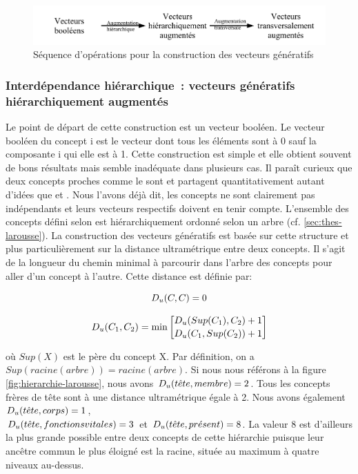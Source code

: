 \begin{figure}[h]
  
  \centering\includegraphics[width=16cm]{2_Etat-art/img/VG-VC}
\caption{Séquence d'opérations pour la construction des vecteurs génératifs}
\label{fig:VG-VC}
\end{figure}

\subsubsection{Interdépendance hiérarchique~: vecteurs génératifs
  hiérarchiquement augmentés}


Le point de départ de cette construction est un vecteur booléen. Le
vecteur booléen du concept i est le vecteur dont tous les éléments
sont à 0 sauf la composante i qui elle est à 1.  Cette construction
est simple et elle obtient souvent de bons résultats mais semble
inadéquate dans plusieurs cas.  Il paraît curieux que deux concepts
proches comme le sont  et  partagent
quantitativement autant d'idées que  et
.  Nous l'avons déjà dit, les concepts ne sont
clairement pas indépendants et leurs vecteurs respectifs doivent en
tenir compte.  L'ensemble des concepts défini selon
\cite{Thesaurus1992} est hiérarchiquement ordonné selon un arbre (cf.
\ref{sec:thes-larousse}).  La construction des vecteurs génératifs est
basée sur cette structure et plus particulièrement sur la distance
ultramétrique  entre deux concepts.  Il
s'agit de la longueur du chemin minimal à parcourir dans l'arbre des
concepts pour aller d'un concept à l'autre.  Cette distance est
définie par:

\begin{equation}
D_{u}(C, C) = 0 
\end{equation}

\begin{equation}
D_{u}(C_{1}, C_{2}) = \min 
{D_{u}(Sup(C_{1}), C_{2})+1 \brack
D_{u}(C_{1}, Sup(C_{2}))+1} 
\end{equation}

où $Sup(X)$ est le père du concept X. Par définition, on a $Sup
(racine(arbre)) = racine (arbre)$. Si nous nous référons à la figure
\ref{fig:hierarchie-larousse}, nous avons $D_{u}(t\hat{e}te,
  membre)=2$. Tous les concepts frères de tête sont à une distance
ultramétrique  égale à 2.  Nous avons
également $D_{u}(t\hat{e}te, corps)=1$,\\$D_{u}(t\hat{e}te, fonctions
  vitales)=3$ et $D_{u}(t\hat{e}te, pr\acute{e}sent)=8$. La valeur 8
est d'ailleurs la plus grande possible entre deux concepts de cette
hiérarchie puisque leur ancêtre commun le plus éloigné est la racine,
située au maximum à quatre niveaux au-dessus.

